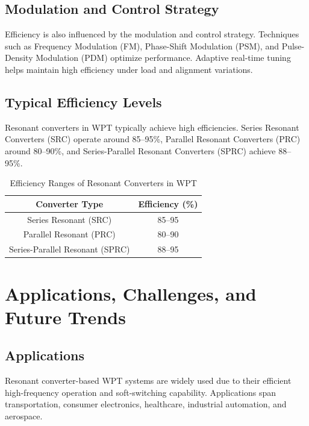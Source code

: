 \documentclass[12pt,a4paper]{report}
\begin{document}
\section{Modulation and Control Strategy}  
Efficiency is also influenced by the modulation and control strategy. Techniques such as Frequency Modulation (FM), Phase-Shift Modulation (PSM), and Pulse-Density Modulation (PDM) optimize performance. Adaptive real-time tuning helps maintain high efficiency under load and alignment variations.\cite{erickson2020resonant}

\section{Typical Efficiency Levels}  
Resonant converters in WPT typically achieve high efficiencies. Series Resonant Converters (SRC) operate around 85–95\%, Parallel Resonant Converters (PRC) around 80–90\%, and Series-Parallel Resonant Converters (SPRC) achieve 88–95\%.

\begin{table}[H]
    \centering
    \caption{Efficiency Ranges of Resonant Converters in WPT}
    \begin{tabular}{|c|c|}
        \hline
        \textbf{Converter Type} & \textbf{Efficiency (\%)} \\
        \hline
        Series Resonant (SRC) & 85–95 \\
        Parallel Resonant (PRC) & 80–90 \\
        Series-Parallel Resonant (SPRC) & 88–95 \\
        \hline
    \end{tabular}
\end{table}

\chapter{Applications, Challenges, and Future Trends}
\vspace{1cm}

\section{Applications}

Resonant converter-based WPT systems are widely used due to their efficient high-frequency operation and soft-switching capability. Applications span transportation, consumer electronics, healthcare, industrial automation, and aerospace.
\end{document}
